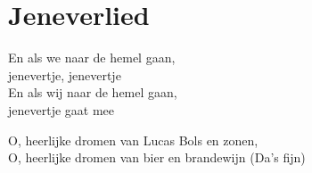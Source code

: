 \section{Jeneverlied}
En als we naar de hemel gaan,\\
jenevertje, jenevertje\\
En als wij naar de hemel gaan,\\
jenevertje gaat mee

O, heerlijke dromen van Lucas Bols en zonen,\\ O, heerlijke dromen van bier en brandewijn (Da's fijn)
